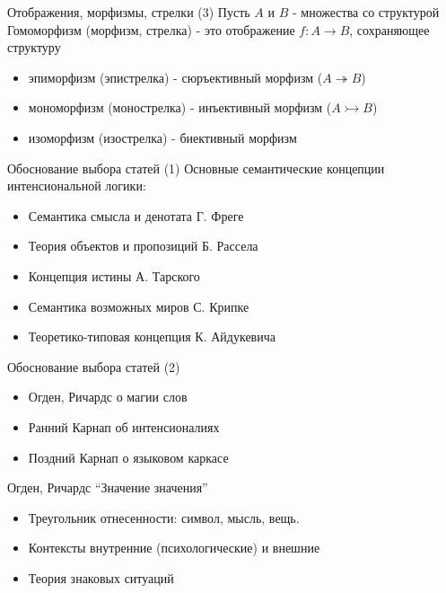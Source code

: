 \documentclass{beamer}
\begin{document}
\begin{frame}{Отображения, морфизмы, стрелки (3)}
Пусть $A$ и $B$ - множества со структурой\\ \bigskip
Гомоморфизм (морфизм, стрелка) - это отображение $f : A \to B$, сохраняющее структуру\\
  \begin{itemize}
    \item эпиморфизм (эпистрелка) - сюръективный морфизм ($A \twoheadrightarrow B$)
    \item мономорфизм (монострелка) - инъективный морфизм ($A \rightarrowtail B$)
    \item изоморфизм (изострелка) - биективный морфизм 
  \end{itemize}
\end{frame}


\begin{frame}{Обоснование выбора статей (1)}
Основные семантические концепции интенсиональной логики:\\
  \begin{itemize}
    \item Семантика смысла и денотата Г. Фреге
    \item Теория объектов и пропозиций Б. Рассела
    \item Концепция истины А. Тарского
    \item Семантика возможных миров С. Крипке
    \item Теоретико-типовая концепция К. Айдукевича
  \end{itemize}
\end{frame}

\begin{frame}{Обоснование выбора статей (2)}
  \begin{itemize}
    \item Огден, Ричардс о магии слов
    \item Ранний Карнап об интенсионалиях
    \item Поздний Карнап о языковом каркасе
  \end{itemize}
\end{frame}


\begin{frame}{Огден, Ричардс ``Значение значения''}
  \begin{itemize}
    \item Треугольник отнесенности: символ, мысль, вещь.
    \item Контексты внутренние (психологические) и внешние
    \item Теория знаковых ситуаций
  \end{itemize}
\end{frame}
\end{document}
